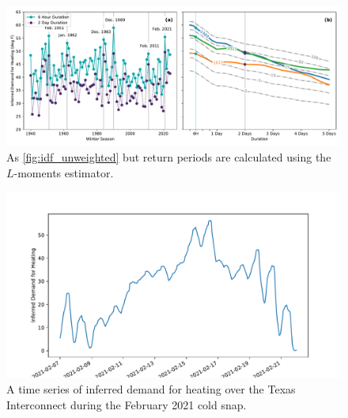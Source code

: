 \documentclass[12pt]{iopart}
\begin{document}
\begin{figure}
  \centering
  \includegraphics[width=\textwidth]{ERCOT_HDD_IDF_plotpos_unweighted.pdf}
  \caption{
    As \cref{fig:idf_unweighted} but return periods are calculated using the $L$-moments estimator.
  }\label{fig:idf_lmoments_unweighted}
\end{figure}

\begin{figure}
  \centering
  \includegraphics[width=\textwidth]{HDD_pop_weighted_ts.pdf}
  \caption{
    A time series of inferred demand for heating over the Texas Interconnect during the February 2021 cold snap.
  }\label{fig:hdd_ts}
\end{figure}
\end{document}
